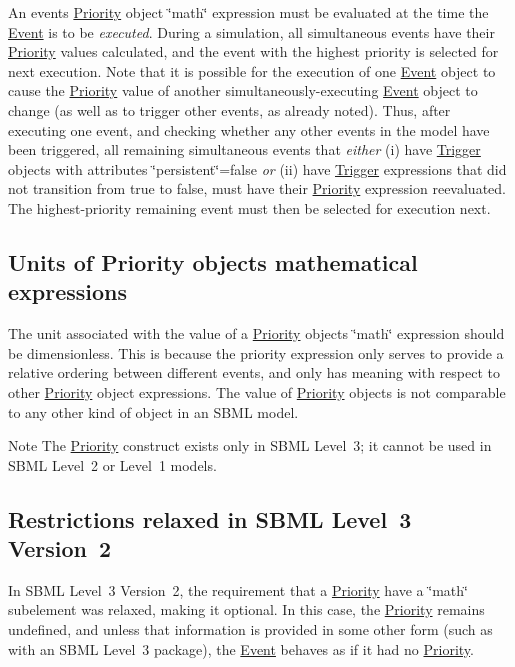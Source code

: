 An event\textquotesingle{}s \hyperlink{class_priority}{Priority} object \char`\"{}math\char`\"{} expression must be evaluated at the time the \hyperlink{class_event}{Event} is to be {\itshape executed}. During a simulation, all simultaneous events have their \hyperlink{class_priority}{Priority} values calculated, and the event with the highest priority is selected for next execution. Note that it is possible for the execution of one \hyperlink{class_event}{Event} object to cause the \hyperlink{class_priority}{Priority} value of another simultaneously-\/executing \hyperlink{class_event}{Event} object to change (as well as to trigger other events, as already noted). Thus, after executing one event, and checking whether any other events in the model have been triggered, all remaining simultaneous events that {\itshape either} (i) have \hyperlink{class_trigger}{Trigger} objects with attributes \char`\"{}persistent\char`\"{}={\ttfamily false} {\itshape or} (ii) have \hyperlink{class_trigger}{Trigger} expressions that did not transition from {\ttfamily true} to {\ttfamily false}, must have their \hyperlink{class_priority}{Priority} expression reevaluated. The highest-\/priority remaining event must then be selected for execution next.\hypertarget{class_priority_priority-units}{}\subsection{Units of Priority object\textquotesingle{}s mathematical expressions}\label{class_priority_priority-units}
The unit associated with the value of a \hyperlink{class_priority}{Priority} object\textquotesingle{}s \char`\"{}math\char`\"{} expression should be {\ttfamily dimensionless}. This is because the priority expression only serves to provide a relative ordering between different events, and only has meaning with respect to other \hyperlink{class_priority}{Priority} object expressions. The value of \hyperlink{class_priority}{Priority} objects is not comparable to any other kind of object in an S\+B\+ML model.

\begin{DoxyNote}{Note}
The \hyperlink{class_priority}{Priority} construct exists only in S\+B\+ML Level~3; it cannot be used in S\+B\+ML Level~2 or Level~1 models.
\end{DoxyNote}
\hypertarget{class_priority_priority-restrictions}{}\subsection{Restrictions relaxed in S\+B\+M\+L Level 3 Version 2}\label{class_priority_priority-restrictions}
In S\+B\+ML Level~3 Version~2, the requirement that a \hyperlink{class_priority}{Priority} have a \char`\"{}math\char`\"{} subelement was relaxed, making it optional. In this case, the \hyperlink{class_priority}{Priority} remains undefined, and unless that information is provided in some other form (such as with an S\+B\+ML Level~3 package), the \hyperlink{class_event}{Event} behaves as if it had no \hyperlink{class_priority}{Priority}.

